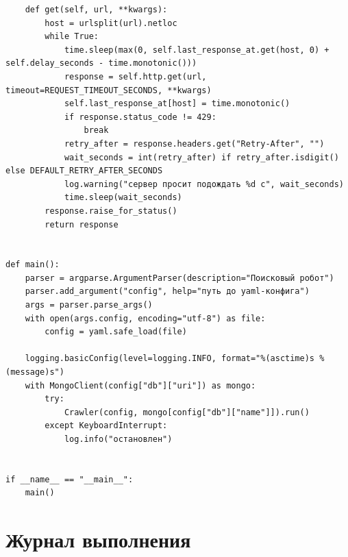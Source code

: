 \documentclass[12pt,a4paper,oneside,fleqn]{article}
\begin{document}
\begin{lstlisting}
    def get(self, url, **kwargs):
        host = urlsplit(url).netloc
        while True:
            time.sleep(max(0, self.last_response_at.get(host, 0) + self.delay_seconds - time.monotonic()))
            response = self.http.get(url, timeout=REQUEST_TIMEOUT_SECONDS, **kwargs)
            self.last_response_at[host] = time.monotonic()
            if response.status_code != 429:
                break
            retry_after = response.headers.get("Retry-After", "")
            wait_seconds = int(retry_after) if retry_after.isdigit() else DEFAULT_RETRY_AFTER_SECONDS
            log.warning("сервер просит подождать %d с", wait_seconds)
            time.sleep(wait_seconds)
        response.raise_for_status()
        return response


def main():
    parser = argparse.ArgumentParser(description="Поисковый робот")
    parser.add_argument("config", help="путь до yaml-конфига")
    args = parser.parse_args()
    with open(args.config, encoding="utf-8") as file:
        config = yaml.safe_load(file)

    logging.basicConfig(level=logging.INFO, format="%(asctime)s %(message)s")
    with MongoClient(config["db"]["uri"]) as mongo:
        try:
            Crawler(config, mongo[config["db"]["name"]]).run()
        except KeyboardInterrupt:
            log.info("остановлен")


if __name__ == "__main__":
    main()
\end{lstlisting}

\pagebreak

\section{Журнал выполнения}
\end{document}
